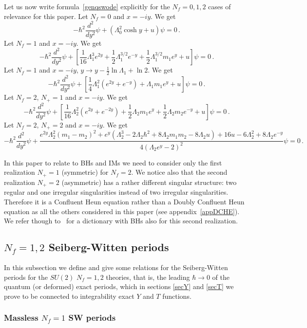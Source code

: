 \documentclass[11pt,a4paper]{elsarticle}
\newcommand{\be}{\begin{equation}}
\newcommand{\ee}{\end{equation}}
\numberwithin{figure}{section}
\numberwithin{table}{section}
\begin{document}
Let us now write formula~\eqref{genqswode} explicitly for the $N_f=0,1,2$ cases of relevance for this paper. Let $N_f= 0$ and $x = -i y $. We get
\be 
-\hbar^2  \frac{d^2}{d y^2} \psi + ( \Lambda_0^2 \cosh y + u) \psi = 0\,.
\ee 
Let $N_f= 1$ and $x = -i y $. We get
\be 
-\hbar^2  \frac{d^2}{d y^2} \psi + \left[\frac{1}{16} \Lambda_1^3 e^{2y} +\frac{1}{2}\Lambda_1^{3/2}e^{-y}  +\frac{1}{2} \Lambda_1^{3/2} m_1 e^y +u\right] \psi = 0\,.
\ee Let $N_f= 1$ and $x = -i y $, $y \to y- \frac{1}{2} \ln \Lambda_1 +\ln 2$. We get
\be 
-\hbar^2  \frac{d^2}{d y^2} \psi + \left[\frac{1}{4} \Lambda_1^2 (e^{2y} +e^{-y} ) + \Lambda_1 m_1 e^y +u\right] \psi = 0\,.
\ee 
Let $N_f=2$, $N_+=1$ and $x = - i y$. We get
\be 
-\hbar^2  \frac{d^2}{d y^2} \psi + \left[\frac{1}{16} \Lambda_2^2 (e^{2y} +e^{-2y} ) + \frac{1}{2}\Lambda_2 m_1 e^y + \frac{1}{2}\Lambda_2 m_2 e^{-y} +u\right] \psi = 0\,.
\ee 
Let $N_f=2$, $N_+=2$ and $x = - i y$. We get
\be \label{qsw20noshift}
-\hbar^2 \frac{d^2}{dy^2} \psi + \frac{e^{2 y} \Lambda_2^2\left( m_1- m_2\right)^2+e^y \left(\Lambda_2^3-2 \Lambda_2 \hbar^2+8 \Lambda_2 m_1 m_2-8 \Lambda_2 u\right)+16 u-6 \Lambda_2^2+8 \Lambda_2 e^{-y}}{4  \left(\Lambda_2 e^y-2\right)^2} \psi=0\,.
\ee 

In this paper to relate to BHs and IMs we need to consider only the first realization $N_+=1$ (symmetric) for $N_f=2$. We notice also that the second realization $N_+=2$ (asymmetric) has a rather different singular structure: two regular and one irregular singularities instead of two irregular singularities. Therefore it is a Confluent Heun equation rather than a Doubly Confluent Heun equation as all the others considered in this paper (see appendix~\ref{appDCHE}). We refer though to~\cite{BianchiConsoliGrilloMorales:2021b} for a dictionary with BHs also for this second realization.


\subsection{$N_f=1,2$ Seiberg-Witten periods} \label{app:Nf1SWper} \label{appSWper}

In this subsection we define and give some relations for the Seiberg-Witten periods for the $SU(2)$ $N_f=1,2$ theories, that is, the leading $\hbar \to 0$ of the quantum (or deformed) exact periods, which in sections \ref{secY} and \ref{secT} we prove to be connected to integrability exact $Y$ and $T$ functions.

\subsubsection{Massless $N_f=1$ SW periods}
\end{document}
